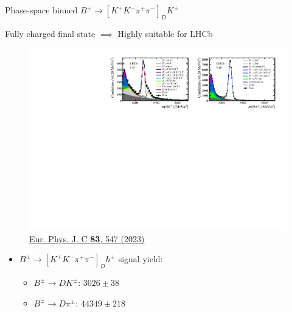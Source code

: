 \documentclass[xcolor={dvipsnames}]{beamer}
\begin{document}
\begin{frame}{Phase-space binned $B^\pm\to[K^+K^-\pi^+\pi^-]_DK^\pm$}
  \begin{center}
    {\large Fully charged final state $\implies$ Highly suitable for LHCb}
  \end{center}
  \begin{figure}
    \centering
    \includegraphics[width = 1.0\textwidth,trim={0 0 0 0},clip=true]{Plots/d2kkpipi_fiveL_allDP.pdf}
    \caption*{\tiny\href{https://link.springer.com/article/10.1140/epjc/s10052-023-11560-5}{Eur. Phys. J. C \textbf{83}, 547 (2023)}}
  \end{figure}
  \vspace{-0.5cm}
  \begin{itemize}
    \item{$B^\pm\to[K^+K^-\pi^+\pi^-]_Dh^\pm$ signal yield:}
    \begin{itemize}
      \item{$B^\pm\to DK^\pm$: $3026 \pm 38$}
      \item{$B^\pm\to D\pi^\pm$: $44349 \pm 218$}
    \end{itemize}
  \end{itemize}
\end{frame}
\end{document}
